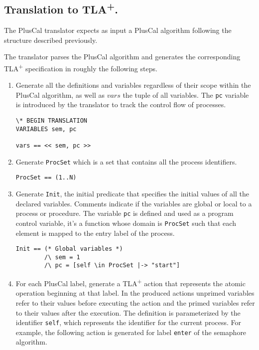 \documentclass[journal]{IEEEtran}
\newcommand{\tlaplus}{TLA\textsuperscript{+}\xspace}
\begin{document}
\subsection{Translation to \tlaplus.}
The PlusCal translator expects as input a PlusCal algorithm following the structure described previously.

The translator parses the PlusCal algorithm and generates the corresponding \tlaplus specification in roughly the following steps.

\begin{enumerate}
\item Generate all the definitions and variables regardless of their scope within the PlusCal algorithm, as well as $vars$ the tuple of all variables.
The \verb|pc| variable is introduced by the translator to track the control flow of processes.

\FloatBarrier
\begin{lstlisting}[frame = tlrb, firstnumber = 1]
\* BEGIN TRANSLATION
VARIABLES sem, pc

vars == << sem, pc >>

\end{lstlisting}

\item Generate \verb|ProcSet| which is a set that contains all the process identifiers.

\begin{lstlisting}[frame = tlrb, firstnumber = 1]
ProcSet == (1..N)

\end{lstlisting}

\item  Generate \verb|Init|, the initial predicate that specifies the initial values of all the declared variables. Comments indicate if the variables are global or local to a process or procedure.
The variable \verb|pc| is defined and used as a program control variable, it's a function whose domain is \verb|ProcSet| such that each element is mapped to the entry label of the process.

\begin{lstlisting}[frame = tlrb, firstnumber = 1]
Init == (* Global variables *)
        /\ sem = 1
        /\ pc = [self \in ProcSet |-> "start"]

\end{lstlisting}

\item For each PlusCal label, generate a \tlaplus action that represents the atomic operation beginning at that label. 
In the produced actions unprimed variables refer to their values before executing the action and the primed variables refer to their values after the execution.
The definition is parameterized by the identifier \verb|self|,
which represents the identifier for the current process. For example, the following action is generated for label \texttt{enter} of the semaphore algorithm.


\end{enumerate}
\end{document}
